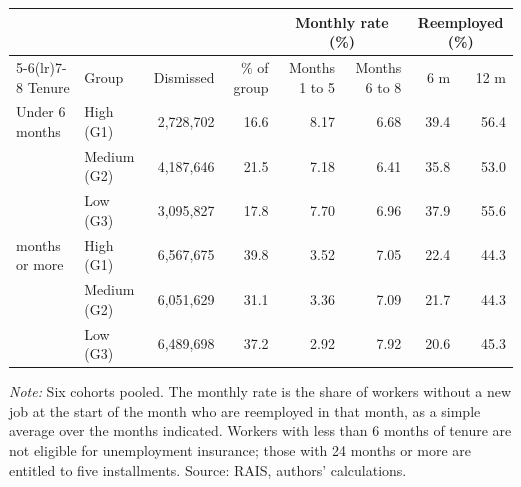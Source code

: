 {\footnotesize
\setlength{\tabcolsep}{4pt}
\begin{threeparttable}
\begin{tabular}{llrrrrrr}
\toprule
 & & & & \multicolumn{2}{c}{Monthly rate (\%)} & \multicolumn{2}{c}{Reemployed (\%)} \\
\cmidrule(lr){5-6}\cmidrule(lr){7-8}
Tenure & Group & Dismissed & \% of group & Months 1 to 5 & Months 6 to 8 & 6 m & 12 m \\
\midrule
Under 6 months & High (G1) & 2,728,702 & 16.6 & 8.17 & 6.68 & 39.4 & 56.4 \\
 & Medium (G2) & 4,187,646 & 21.5 & 7.18 & 6.41 & 35.8 & 53.0 \\
 & Low (G3) & 3,095,827 & 17.8 & 7.70 & 6.96 & 37.9 & 55.6 \\
\addlinespace[3pt]
24 months or more & High (G1) & 6,567,675 & 39.8 & 3.52 & 7.05 & 22.4 & 44.3 \\
 & Medium (G2) & 6,051,629 & 31.1 & 3.36 & 7.09 & 21.7 & 44.3 \\
 & Low (G3) & 6,489,698 & 37.2 & 2.92 & 7.92 & 20.6 & 45.3 \\
\bottomrule
\end{tabular}
\begin{tablenotes}[flushleft]\footnotesize
\item \textit{Note:} Six cohorts pooled. The monthly rate is the share of workers without a new job at the start of the month who are reemployed in that month, as a simple average over the months indicated. Workers with less than 6 months of tenure are not eligible for unemployment insurance; those with 24 months or more are entitled to five installments. Source: RAIS, authors' calculations.
\end{tablenotes}
\end{threeparttable}
}
